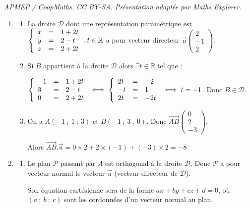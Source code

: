 \documentclass[10pt]{article}
\providecommand{\R}{\mathbb{R}}
\providecommand{\vect}[1]{\overrightarrow{#1}}
\begin{document}
\noindent\textit{APMEP / CoopMaths. CC BY-SA. Présentation adaptée par Maths Explorer.}\par\medskip
\medskip

\begin{enumerate}
	\item 
	\begin{enumerate}
	\item La droite $\mathcal{D}$ dont une représentation paramétrique est $\left\{\begin{array}{l c l}
		x&=&1+2t\\y &=& 2 - t\\z&=& 2+2t
	\end{array}\right.  , t \in \R$ a pour vecteur directeur \(\overrightarrow{u}\begin{pmatrix}2\\-1\\2\end{pmatrix}\).
	\item Si $B$ appartient à la droite $\mathcal{D}$ alors $\exists t \in \R$ tel que :
	
	 $\left\{\begin{array}{l c l} -1&=&1+2t\\3 &=& 2 - t\\0&=& 2+2t
	\end{array}\right.\iff \left\{\begin{array}{l c l}
	2t&=&-2\\-t&=&1\\2t&=&-2t\end{array}\right. \iff t=-1 $. Donc $B \in  \mathcal{D}$.
\item On a $A(-1~;~1~;~3)$ et $B(-1~;~3~;~0)$. Donc \(\overrightarrow{AB}\begin{pmatrix}0\\2\\-3\end{pmatrix}\).

Alors $\vect{AB}.\vect{u}=0\times 2+2\times (-1)+(-3)\times 2=-8$
\end{enumerate}
\item 
	\begin{enumerate}
		\item Le plan $\mathcal{P}$ passant par $A$ est orthogonal à la droite $\mathcal{D}$. Donc $\mathcal{P}$ a pour vecteur normal le vecteur $\vect{u}$ (vecteur directeur de $\mathcal{D}$).
	
Son équation cartésienne sera de la forme $ax+by+cz+d=0$, où $(a~;~b~;~c)$ sont les cordonnées d'un vecteur normal au plan.
	

\end{enumerate}
\end{enumerate}
\end{document}
